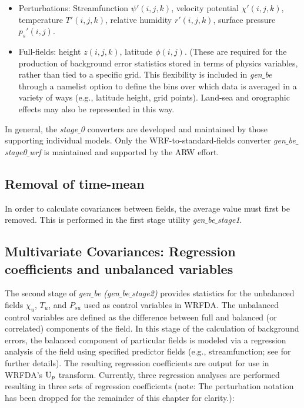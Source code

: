 \begin{itemize}\setlength{\parskip}{-4pt}
\item
 	Perturbations: Streamfunction $\psi'(i,j,k)$, velocity potential $\chi'(i,j,k)$, 
temperature $T'(i,j,k)$, relative humidity $r'(i,j,k)$, surface pressure $p_s'(i,j)$.

\item
 	Full-fields: height $z(i,j,k)$, latitude $\phi(i,j)$. (These are required for the 
production of background error statistics stored in terms of physics variables, 
rather than tied to a specific grid. This flexibility is included in {\it gen$\_$be} through a 
namelist option to define the bins over which data is averaged in a variety of ways 
(e.g., latitude height, grid points). Land-sea and orographic effects may also be 
represented in this way.
\end{itemize}

In general, the {\it stage$\_$0} converters are developed and maintained by those supporting
individual models. Only the WRF-to-standard-fields converter {\it gen$\_$be$\_$stage0$\_$wrf} 
is maintained and supported by the ARW effort.

\subsection{Removal of time-mean}

In order to calculate covariances between fields, the average value must first be removed. 
This is performed in the first stage utility {\it gen$\_$be$\_$stage1}. 

\subsection{Multivariate Covariances: Regression coefficients and unbalanced variables}

The second stage
of {\it gen$\_$be (gen$\_$be$\_$stage2)} provides statistics for the
unbalanced fields $\chi_u$, $T_u$, and $P_{su}$ used as control
variables in WRFDA. The unbalanced control variables are defined as
the difference between full and balanced (or correlated) components of
the field. In this stage of the calculation of background errors, the
balanced component of particular fields is modeled via a regression
analysis of the field using specified predictor fields
(e.g., streamfunction; see
\citet{wu02} for further details). The resulting regression coefficients 
are output for use 
in WRFDA's ${\rm U}_p$ transform. Currently, three regression analyses are
performed resulting in three sets of regression coefficients (note:
The perturbation notation has been dropped for the 
remainder of this chapter for clarity.):


